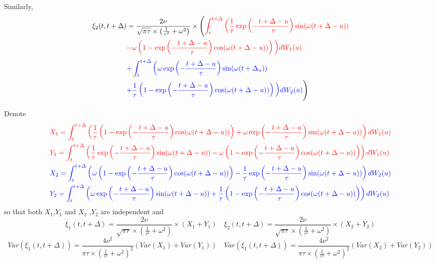 \documentclass[11pt]{article}
\newcommand {\1}{\mathbb{1}}
\begin{document}
Similarly, 
\begin{align*}
	\xi_2(t,t+\Delta)&=\frac{2\nu}{\sqrt{\pi \tau} \times \left( \frac{1}{\tau^2}+\omega^2\right)}  \times \Bigg( \textcolor{red}{\int_t^{t+\Delta} \bigg( \frac{1}{\tau} \exp\left( -\frac{t+\Delta-u}{\tau}\right) \sin(\omega(t+\Delta-u))} \\
	&\textcolor{red}{-\omega \left( 1-\exp \left( -\frac{t+\Delta-u}{\tau}\right) \cos(\omega(t+\Delta-u))\right) \bigg)dW_1(u)} \\
	&  \textcolor{blue}{+\int_t^{t+\Delta} \bigg( \omega \exp\left( -\frac{t+\Delta-u}{\tau}\right) \sin(\omega(t+\Delta_u))} \\
	&\textcolor{blue}{+\frac{1}{\tau} \left(1-\exp\left(-\frac{t+\Delta-u}{\tau} \right) \cos(\omega(t+\Delta-u)) \right) \bigg) dW_2(u)} \Bigg)
\end{align*}

Denote 
\begin{align*}
	& \textcolor{red}{X_1=\int_t^{t+\Delta} \left( \frac{1}{\tau} \left(1-\exp\left( -\frac{t+\Delta-u}{\tau}\right) \cos(\omega(t+\Delta-u))\right) +\omega \exp \left( -\frac{t+\Delta-u}{\tau}\right) \sin(\omega(t+\Delta-u))\right)dW_1(u)} \\ 
	&\textcolor{red}{Y_1=\int_t^{t+\Delta} \left( \frac{1}{\tau} \exp\left( -\frac{t+\Delta-u}{\tau}\right) \sin(\omega(t+\Delta-u)) -\omega \left( 1-\exp \left( -\frac{t+\Delta-u}{\tau}\right) \cos(\omega(t+\Delta-u))\right) \right)dW_1(u)} \\
	&\textcolor{blue}{X_2=\int_t^{t+\Delta} \left( \omega \left(1-\exp\left( -\frac{t+\Delta-u}{\tau}\right) \cos(\omega(t+\Delta-u))\right)-\frac{1}{\tau} \exp\left(-\frac{t+\Delta-u}{\tau} \right) \sin(\omega(t+\Delta-u)) \right) dW_2(u)} \\
	&\textcolor{blue}{Y_2=\int_t^{t+\Delta} \left( \omega \exp\left( -\frac{t+\Delta-u}{\tau}\right) \sin(\omega(t+\Delta-u))+\frac{1}{\tau} \left(1-\exp\left(-\frac{t+\Delta-u}{\tau} \right) \cos(\omega(t+\Delta-u)) \right) \right) dW_2(u)} 
\end{align*}
so that both $X_1$,$Y_1$ and $X_2$
,$Y_2$ are independent and 
\[\xi_1(t,t+\Delta)=\frac{2\nu}{\sqrt{\pi \tau} \times \left( \frac{1}{\tau^2}+\omega^2\right)}  \times (X_1+Y_1) \quad \xi_2(t,t+\Delta)=\frac{2\nu}{\sqrt{\pi \tau} \times \left( \frac{1}{\tau^2}+\omega^2\right)}  \times (X_2+Y_2)\]
\[Var(\xi_1(t,t+\Delta))=\frac{4\nu^2}{\pi \tau \times \left( \frac{1}{\tau^2}+\omega^2\right)^2} (Var(X_1)+Var(Y_1)) \quad Var(\xi_1(t,t+\Delta))=\frac{4\nu^2}{\pi \tau \times \left( \frac{1}{\tau^2}+\omega^2\right)^2} (Var(X_2)+Var(Y_2)) \]
\end{document}
